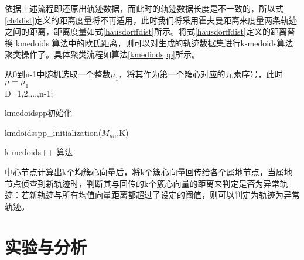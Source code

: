 依据上述流程即还原出轨迹数据，而此时的轨迹数据长度是不一致的，所以式\ref{ch4dist}定义的距离度量将不再适用，此时我们将采用霍夫曼距离来度量两条轨迹之间的距离，距离度量如式\ref{hausdorffdist}所示。将式\ref{hausdorffdist}定义的距离替换 kmedoids 算法中的欧氏距离，则可以对生成的轨迹数据集进行k-medoids算法聚类操作了。具体聚类流程如算法\ref{kmediodspp}所示。

\begin{algorithm}[H]
	 从0到n-1中随机选取一个整数$\mu_1$，将其作为第一个簇心对应的元素序号，此时$\mu={\mu_1}$\;\\
	 D={1,2,...,n-1};\\
	 \caption{kmedoidspp初始化}
\end{algorithm}

\begin{algorithm}[H]
	\label{kmediodspp}
	 kmdoidsspp\_initialization($M_{nn}$,K)\;\\
	 \caption{k-medoids++ 算法}
\end{algorithm}

中心节点计算出k个均簇心向量后，将k个簇心向量回传给各个属地节点，当属地节点侦查到新轨迹时，判断其与回传的k个簇心向量的距离来判定是否为异常轨迹：若新轨迹与所有均值向量距离都超过了设定的阈值，则可以判定为轨迹为异常轨迹。


\section{实验与分析}

